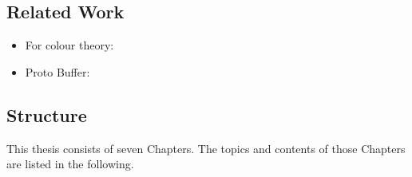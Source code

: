 \documentclass[../MasterThesis.tex]{subfiles}
\begin{document}
	
	
	
	
	
	
	
	
	
	
	
	\subsection{Related Work} \label{subsection:relatedwork}
	
	\begin{itemize}
		\item For colour theory: \cite{colourRGB}
		\item Proto Buffer: \cite{protobuffer}
	\end{itemize}
	
	
	
	
	
	
	
	
	
	
	\subsection{Structure} \label{subsection:structure}
	
	This thesis consists of seven Chapters. The topics and contents of those Chapters are listed in the following.
	
\end{document}
